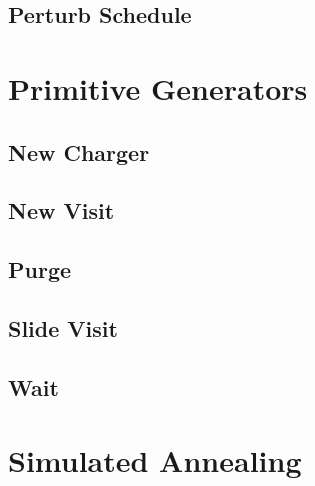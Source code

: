 \documentclass[11pt,a4paper,final]{article}
\begin{document}
\subsection{Perturb Schedule}
\label{sec:org1b943d1}

\newpage

\section{Primitive Generators}
\label{sec:org976c259}
\subsection{New Charger}
\label{sec:orgfebdcd6}

\newpage

\subsection{New Visit}
\label{sec:orga253ef5}

\newpage

\subsection{Purge}
\label{sec:org4614db4}

\newpage

\subsection{Slide Visit}
\label{sec:org99b7569}

\newpage

\subsection{Wait}
\label{sec:org9121ffa}

\newpage


\section{Simulated Annealing}
\label{sec:org893572d}

\end{document}
